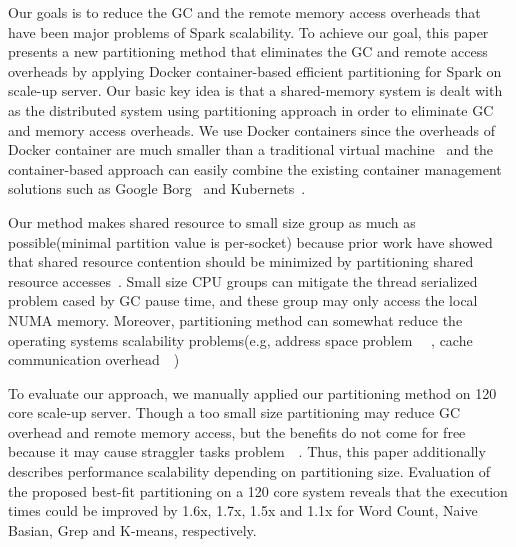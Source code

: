 Our goals is to reduce the GC and the remote memory access overheads that
have been major problems of Spark scalability.
To achieve our goal, this paper presents a new partitioning method that
eliminates the GC and remote access overheads by applying
Docker container-based efficient partitioning for Spark on scale-up
server.
Our basic key idea is that a shared-memory system is dealt with as the
distributed system using partitioning approach in order to eliminate GC and
memory access overheads.
We use Docker containers since the overheads of Docker container are much smaller
than a traditional virtual
machine~\cite{Merkel2014DLL} and the container-based approach can easily combine
the existing container management solutions such as Google Borg~\cite{Borg} and
Kubernets~\cite{Kubernetes}.

Our method makes shared resource to small size group as much as
possible(minimal partition value is per-socket) because prior work have showed
that shared resource contention should be minimized by partitioning shared
resource accesses~\cite{Qureshi2006UCP}.
Small size CPU groups can mitigate the thread serialized problem cased by GC
pause time, and these group may only access the local NUMA memory.
Moreover, partitioning method can somewhat reduce the operating systems
scalability problems(e.g, address space
problem ~\cite{AustinTClements2012RCUBalancedTrees}~\cite{Clements2013RadixVM},
cache communication overhead~\cite{SilasBoydWickizerPth}~\cite{Hendler2010FC})

To evaluate our approach, we manually applied our partitioning method on 120 core
scale-up server.
Though a too small size partitioning may reduce GC overhead and remote memory access,
but the benefits do not come for free because it may cause straggler tasks
problem~\cite{Ousterhout2015MSP}~\cite{Ren2015HDS}.
Thus, this paper additionally describes performance scalability
depending on partitioning size.
Evaluation of the proposed best-fit partitioning on a 120 core system
 reveals that the execution times could be improved by 1.6x, 1.7x, 1.5x and 1.1x
 for Word Count, Naive Basian, Grep and K-means, respectively.

